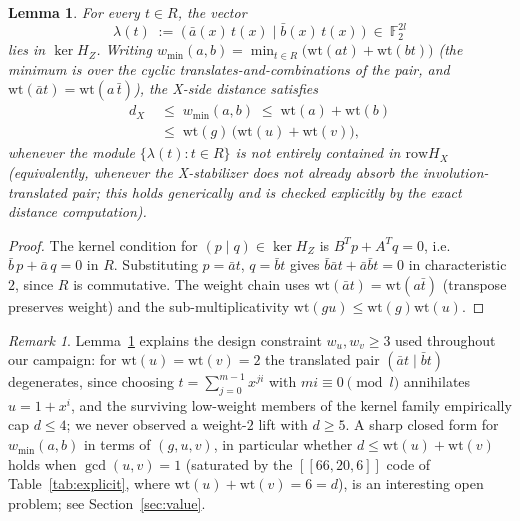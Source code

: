 \documentclass[journal,onecolumn]{IEEEtran}
\newtheorem{lemma}[theorem]{Lemma}
\theoremstyle{definition}
\theoremstyle{remark}
\newtheorem{remark}[theorem]{Remark}
\newcommand{\F}{\mathbb{F}}
\newcommand{\wt}{\mathrm{wt}}
\newcommand{\row}{\mathrm{row}}
\newcommand{\invol}[1]{\bar{#1}}
\begin{document}
\begin{lemma}\label{lem:weightcap}
For every $t\in R$, the vector
\[
\lambda(t)\;:=\;\bigl(\,\invol{a}(x)\,t(x)\;\big|\;\invol{b}(x)\,t(x)\,\bigr)
\ \in\ \F_2^{2l}
\]
lies in $\ker H_Z$. Writing
$w_{\min}(a,b)=\min_{t\in R}\bigl(\wt(at)+\wt(bt)\bigr)$ (the minimum is over
the cyclic translates-and-combinations of the pair, and
$\wt(\invol{a}t)=\wt(a\,\invol{t})$), the X-side distance satisfies
\[
\begin{aligned}
d_X\;&\le\;w_{\min}(a,b)\;\le\;\wt(a)+\wt(b)\\
     &\le\;\wt(g)\,\bigl(\wt(u)+\wt(v)\bigr),
\end{aligned}
\]
whenever the module $\{\lambda(t):t\in R\}$ is not entirely contained in
$\row H_X$ (equivalently, whenever the X-stabilizer does not already absorb
the involution-translated pair; this holds generically and is checked
explicitly by the exact distance computation).
\end{lemma}
\begin{proof}
The kernel condition for $(p\mid q)\in\ker H_Z$ is
$B^{T}p+A^{T}q=0$, i.e.\ $\invol{b}\,p+\invol{a}\,q=0$ in $R$. Substituting
$p=\invol{a}t$, $q=\invol{b}t$ gives
$\invol{b}\invol{a}t+\invol{a}\invol{b}t=0$ in characteristic $2$, since $R$
is commutative. The weight chain uses $\wt(\invol{a}t)=\wt(a\invol{t})$
(transpose preserves weight) and the sub-multiplicativity
$\wt(gu)\le\wt(g)\wt(u)$.
\end{proof}

\begin{remark}\label{rem:w2}
Lemma~\ref{lem:weightcap} explains the design constraint
$w_u,w_v\ge3$ used throughout our campaign: for $\wt(u)=\wt(v)=2$ the
translated pair $(\invol{a}t\mid\invol{b}t)$ degenerates, since choosing
$t=\sum_{j=0}^{m-1}x^{ji}$ with $mi\equiv0\pmod l$ annihilates
$u=1+x^{i}$, and the surviving low-weight members of the kernel family
empirically cap $d\le 4$; we never observed a weight-$2$ lift with $d\ge5$.
A sharp closed form for
$w_{\min}(a,b)$ in terms of $(g,u,v)$, in particular whether
$d\le\wt(u)+\wt(v)$ holds when $\gcd(u,v)=1$ (saturated by the
$[[66,20,6]]$ code of Table~\ref{tab:explicit}, where
$\wt(u)+\wt(v)=6=d$), is an interesting open problem; see
Section~\ref{sec:value}.
\end{remark}
\end{document}

